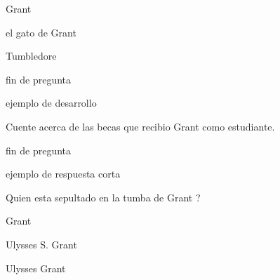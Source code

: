 \documentclass{gift}
\begin{document}
\begin{giftMO}
\item \begin{giftFragmento}
Grant\end  {giftFragmento}


\item \begin{giftFragmento}
el gato de Grant\end  {giftFragmento}


\item \begin{giftFragmento}
Tumbledore\end  {giftFragmento}


\end  {giftMO}

\begin{giftFragmento}
\end  {giftFragmento}


\begin{giftComentario}
 fin de  pregunta
\end  {giftComentario}

\begin{giftComentario}
  ejemplo  de  desarrollo
\end  {giftComentario}
\begin{giftFragmento}
Cuente  acerca  de las  becas  que recibio Grant  como  estudiante.\end  {giftFragmento}


\giftEssay{}

\begin{giftFragmento}
\end  {giftFragmento}


\begin{giftComentario}
 fin de  pregunta
\end  {giftComentario}

\begin{giftComentario}
  ejemplo  de  respuesta  corta
\end  {giftComentario}
\begin{giftFragmento}
Quien esta sepultado  en la  tumba de  Grant ?\end  {giftFragmento}


\begin{giftShort}
\item \begin{giftFragmento}
Grant\end  {giftFragmento}


\item \begin{giftFragmento}
Ulysses
S. Grant\end  {giftFragmento}


\item \begin{giftFragmento}
Ulysses  Grant\end  {giftFragmento}


\end  {giftShort}
\end{document}
